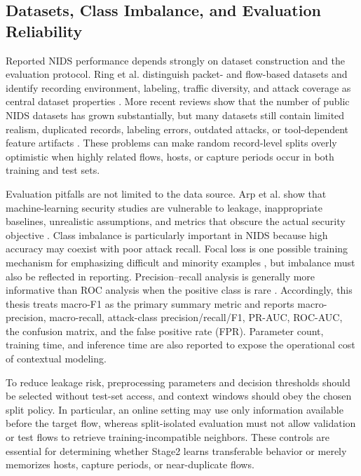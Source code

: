 \subsection{Datasets, Class Imbalance, and Evaluation Reliability}
\label{subsec:rw_evaluation}

Reported NIDS performance depends strongly on dataset construction and the
evaluation protocol. Ring et al. distinguish packet- and flow-based datasets
and identify recording environment, labeling, traffic diversity, and attack
coverage as central dataset properties \cite{Ring2019Datasets}. More recent
reviews show that the number of public NIDS datasets has grown substantially,
but many datasets still contain limited realism, duplicated records, labeling
errors, outdated attacks, or tool-dependent feature artifacts
\cite{Goldschmidt2025Datasets,Pinto2025DatasetReview}. These problems can make
random record-level splits overly optimistic when highly related flows, hosts,
or capture periods occur in both training and test sets.

Evaluation pitfalls are not limited to the data source. Arp et al. show that
machine-learning security studies are vulnerable to leakage, inappropriate
baselines, unrealistic assumptions, and metrics that obscure the actual
security objective \cite{Arp2022DosDonts}. Class imbalance is particularly
important in NIDS because high accuracy may coexist with poor attack recall.
Focal loss is one possible training mechanism for emphasizing difficult and
minority examples \cite{Lin2017FocalLoss}, but imbalance must also be reflected
in reporting. Precision--recall analysis is generally more informative than
ROC analysis when the positive class is rare
\cite{SaitoRehmsmeier2015}. Accordingly, this thesis treats macro-F1 as the
primary summary metric and reports macro-precision, macro-recall, attack-class
precision/recall/F1, PR-AUC, ROC-AUC, the confusion matrix, and the false
positive rate (FPR). Parameter count, training time, and inference time are also
reported to expose the operational cost of contextual modeling.

To reduce leakage risk, preprocessing parameters and decision thresholds should
be selected without test-set access, and context windows should obey the chosen
split policy. In particular, an online setting may use only information
available before the target flow, whereas split-isolated evaluation must not
allow validation or test flows to retrieve training-incompatible neighbors.
These controls are essential for determining whether Stage2 learns transferable
behavior or merely memorizes hosts, capture periods, or near-duplicate flows.

